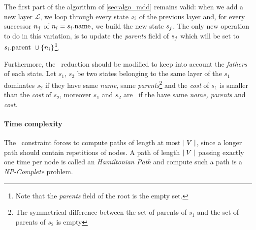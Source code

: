 The first part of the algorithm of \cref{sec:algo_mdd} remains valid: when we add a new layer $\mathcal{L}$, we loop through every state $s_i$ of the previous layer and, for every successor $n_j$ of $n_i = s_i\text{.name}$, we build the new state $s_j$. The only new operation to do in this variation, is to update the \textit{parents} field of $s_j$ which will be set to $s_i\text{.parent } \cup \{n_i\}$\footnote{Note that the \textit{parents} field of the root is the empty set.}.

Furthermore, the \mdd\ reduction should be modified to keep into account the \textit{fathers} of each state. Let $s_1$, $s_2$ be two states belonging to the same layer of the \mdd\; $s_1$ dominates $s_2$ if they have same \textit{name}, same \textit{parents}\footnote{The symmetrical difference between the set of parents of $s_1$ and the set of parents of $s_2$ is empty} and the \textit{cost} of $s_1$ is smaller than the \textit{cost} of $s_2$, moreover $s_1$ and $s_2$ are \compatibleState\ if the have same \textit{name, parents} and \textit{cost}.

\paragraph{Time complexity} The \alldiff\ constraint forces to compute paths of length at most $\mid V \mid$, since a longer path should contain repetitions of nodes. A path of length $\mid V \mid$ passing exactly one time per node is called an \textit{Hamiltonian Path} and compute such a path is a \textit{NP-Complete} problem.

